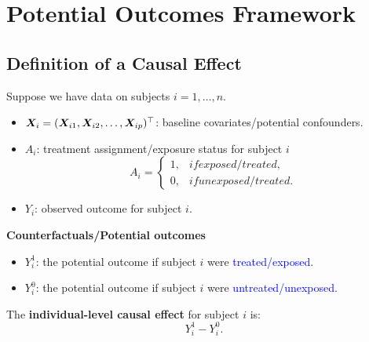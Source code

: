 \section{Potential Outcomes Framework}
\subsection*{Definition of a Causal Effect}
\begin{Regular}{}
    Suppose we have data on subjects $ i=1,\ldots,n $.
    \begin{itemize}
        \item $ \bm{X}_i=(\bm{X}_{i1},\bm{X}_{i2},\ldots,\bm{X}_{ip})^\top $: baseline covariates/potential confounders.
        \item $ A_i $: treatment assignment/exposure status for subject $ i $
              \[ A_i=\begin{cases*}
                      1, & if exposed/treated,   \\
                      0, & if unexposed/treated.
                  \end{cases*} \]
        \item $ Y_i $: observed outcome for subject $ i $.
    \end{itemize}
    \textbf{Counterfactuals/Potential outcomes}
    \begin{itemize}
        \item $ Y_i^1 $: the potential outcome if subject $ i $ were \textcolor{Blue}{treated/exposed}.
        \item $ Y_i^0 $: the potential outcome if subject $ i $ were \textcolor{Blue}{untreated/unexposed}.
    \end{itemize}
\end{Regular}
\begin{Regular}{}
    The \textbf{individual-level causal effect} for subject $ i $ is:
    \[ Y_i^1-Y_i^0. \]
\end{Regular}
